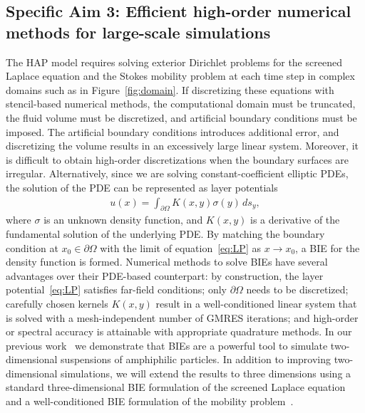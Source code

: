 \newpage

\subsection{Specific Aim 3: Efficient high-order numerical methods for
large-scale simulations}
\label{subsec:specific_aim_3}
The HAP model requires solving exterior Dirichlet problems for the
screened Laplace equation and the Stokes mobility problem at each time
step in complex domains such as in Figure~\ref{fig:domain}. If
discretizing these equations with stencil-based numerical methods, the
computational domain must be truncated, the fluid volume must be
discretized, and artificial boundary conditions must be imposed. The
artificial boundary conditions introduces additional error, and
discretizing the volume results in an excessively large linear system.
Moreover, it is difficult to obtain high-order discretizations when the
boundary surfaces are irregular. Alternatively, since we are solving
constant-coefficient elliptic PDEs, the solution of the PDE can be
represented as layer potentials
\begin{align}
  \label{eq:LP}
  u(x) = \int_{\partial\Omega} K(x,y) \sigma(y)\,ds_y,
\end{align}
where $\sigma$ is an unknown density function, and $K(x,y)$ is a
derivative of the fundamental solution of the underlying PDE. By
matching the boundary condition at $x_0 \in \partial\Omega$ with the
limit of equation~\eqref{eq:LP} as $x\rightarrow x_0$, a BIE for the
density function is formed. Numerical methods to solve BIEs have several
advantages over their PDE-based counterpart: by construction, the layer
potential~\eqref{eq:LP} satisfies far-field conditions; only
$\partial\Omega$ needs to be discretized; carefully chosen kernels
$K(x,y)$ result in a well-conditioned linear system that is solved with
a mesh-independent number of GMRES iterations; and high-order or
spectral accuracy is attainable with appropriate quadrature methods. In
our previous work~\cite{Fu2018_SIAM} we demonstrate that BIEs are a
powerful tool to simulate two-dimensional suspensions of amphiphilic
particles. In addition to improving two-dimensional simulations, we will
extend the results to three dimensions using a standard
three-dimensional BIE formulation of the screened Laplace
equation~\cite{ying_2006} and a well-conditioned BIE formulation of the
mobility problem~\cite{manasthesis, rac-gre2016}.

